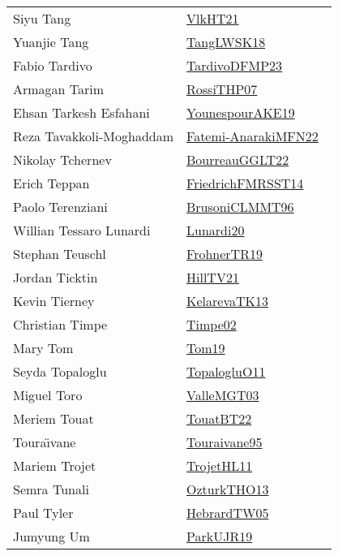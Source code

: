 {\begin{longtable}{p{4cm}p{20cm}}
Siyu Tang & \href{articles/VlkHT21.pdf}{VlkHT21}~\cite{VlkHT21}\\
Yuanjie Tang & \href{}{TangLWSK18}~\cite{TangLWSK18}\\
Fabio Tardivo & \href{papers/TardivoDFMP23.pdf}{TardivoDFMP23}~\cite{TardivoDFMP23}\\
Armagan Tarim & \href{papers/RossiTHP07.pdf}{RossiTHP07}~\cite{RossiTHP07}\\
Ehsan Tarkesh Esfahani & \href{}{YounespourAKE19}~\cite{YounespourAKE19}\\
Reza Tavakkoli-Moghaddam & \href{}{Fatemi-AnarakiMFN22}~\cite{Fatemi-AnarakiMFN22}\\
Nikolay Tchernev & \href{articles/BourreauGGLT22.pdf}{BourreauGGLT22}~\cite{BourreauGGLT22}\\
Erich Teppan & \href{}{FriedrichFMRSST14}~\cite{FriedrichFMRSST14}\\
Paolo Terenziani & \href{papers/BrusoniCLMMT96.pdf}{BrusoniCLMMT96}~\cite{BrusoniCLMMT96}\\
Willian Tessaro Lunardi & \href{}{Lunardi20}~\cite{Lunardi20}\\
Stephan Teuschl & \href{papers/FrohnerTR19.pdf}{FrohnerTR19}~\cite{FrohnerTR19}\\
Jordan Ticktin & \href{papers/HillTV21.pdf}{HillTV21}~\cite{HillTV21}\\
Kevin Tierney & \href{papers/KelarevaTK13.pdf}{KelarevaTK13}~\cite{KelarevaTK13}\\
Christian Timpe & \href{articles/Timpe02.pdf}{Timpe02}~\cite{Timpe02}\\
Mary Tom & \href{papers/Tom19.pdf}{Tom19}~\cite{Tom19}\\
Seyda Topaloglu & \href{articles/TopalogluO11.pdf}{TopalogluO11}~\cite{TopalogluO11}\\
Miguel Toro & \href{papers/ValleMGT03.pdf}{ValleMGT03}~\cite{ValleMGT03}\\
Meriem Touat & \href{papers/TouatBT22.pdf}{TouatBT22}~\cite{TouatBT22}\\
Toura{\"{\i}}vane & \href{papers/Touraivane95.pdf}{Touraivane95}~\cite{Touraivane95}\\
Mariem Trojet & \href{articles/TrojetHL11.pdf}{TrojetHL11}~\cite{TrojetHL11}\\
Semra Tunali & \href{articles/OzturkTHO13.pdf}{OzturkTHO13}~\cite{OzturkTHO13}\\
Paul Tyler & \href{papers/HebrardTW05.pdf}{HebrardTW05}~\cite{HebrardTW05}\\
Jumyung Um & \href{papers/ParkUJR19.pdf}{ParkUJR19}~\cite{ParkUJR19}\\

\end{longtable}}
